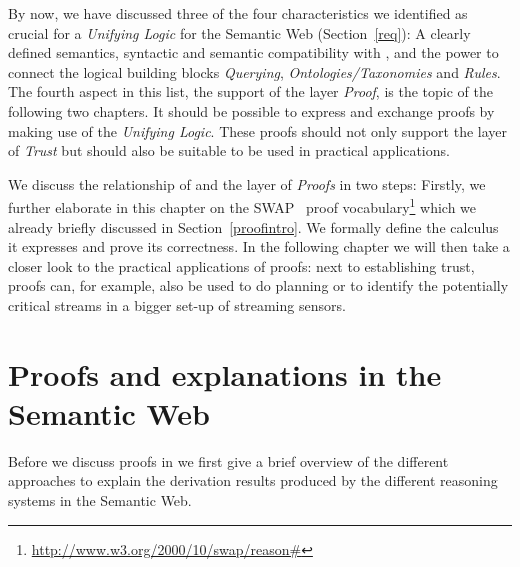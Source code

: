 By now, we have discussed three of the four characteristics we identified as crucial for a \emph{Unifying Logic} for the Semantic Web (Section~\ref{req}): 
A clearly defined semantics, 
syntactic and semantic compatibility with \rdf, and the power to connect the logical building blocks \emph{Querying}, \emph{Ontologies/Taxonomies} and \emph{Rules}. 
The fourth aspect in this list, the support of the layer \emph{Proof}, is the topic of the following two chapters. It should be possible to express and exchange proofs
 by making use of the \emph{Unifying Logic}. %
These proofs should not only support the layer of \emph{Trust} but should also be suitable to be used in practical applications.  

We discuss the relationship of \nthreelogic and the layer of \emph{Proofs} in two steps: Firstly, 
we further elaborate in this chapter on the SWAP~\cite{SWAP} proof vocabulary\footnote{\url{http://www.w3.org/2000/10/swap/reason\#}} 
which we already briefly discussed in Section~\ref{proofintro}. 
We formally define the calculus it expresses and prove its correctness. 
In the following chapter we will then take a closer look to the practical applications of proofs: next to establishing 
trust, proofs can, for example, also be used to do planning or to identify the potentially critical streams in a bigger set-up of streaming sensors. 

\section{Proofs and explanations in the Semantic Web}
Before we discuss proofs in \nthree we first give a brief overview of the different approaches to explain the derivation results produced by the different reasoning systems
in the Semantic Web.

